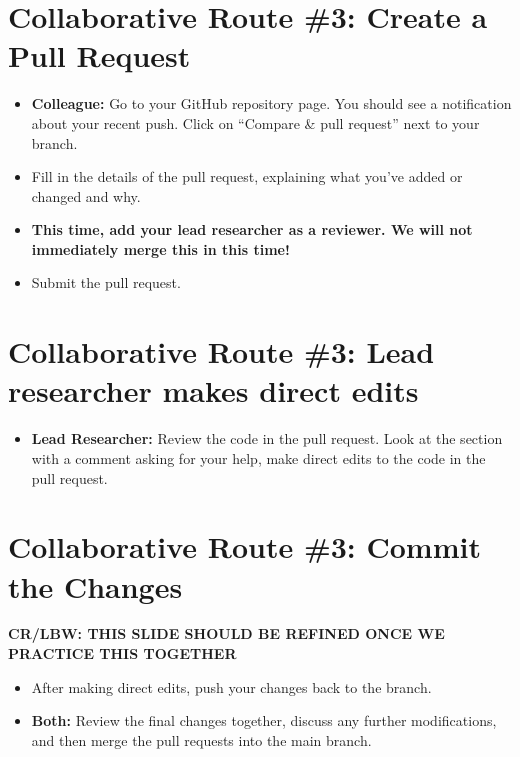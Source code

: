 \documentclass[
]{book}
\providecommand{\tightlist}{%
  \setlength{\itemsep}{0pt}\setlength{\parskip}{0pt}}
\begin{document}
\hypertarget{collaborative-route-3-create-a-pull-request}{%
\section{Collaborative Route \#3: Create a Pull Request}\label{collaborative-route-3-create-a-pull-request}}

\begin{itemize}
\tightlist
\item
  \textbf{Colleague:} Go to your GitHub repository page. You should see a notification about your recent push. Click on ``Compare \& pull request'' next to your branch.\\
\item
  Fill in the details of the pull request, explaining what you've added or changed and why.\\
\item
  \textbf{This time, add your lead researcher as a reviewer. We will not immediately merge this in this time!}\\
\item
  Submit the pull request.
\end{itemize}

\hypertarget{collaborative-route-3-lead-researcher-makes-direct-edits}{%
\section{Collaborative Route \#3: Lead researcher makes direct edits}\label{collaborative-route-3-lead-researcher-makes-direct-edits}}

\begin{itemize}
\tightlist
\item
  \textbf{Lead Researcher:} Review the code in the pull request. Look at the section with a comment asking for your help, make direct edits to the code in the pull request.
\end{itemize}

\hypertarget{collaborative-route-3-commit-the-changes}{%
\section{Collaborative Route \#3: Commit the Changes}\label{collaborative-route-3-commit-the-changes}}

\textbf{CR/LBW: THIS SLIDE SHOULD BE REFINED ONCE WE PRACTICE THIS TOGETHER}

\begin{itemize}
\tightlist
\item
  After making direct edits, push your changes back to the branch.\\
\item
  \textbf{Both:} Review the final changes together, discuss any further modifications, and then merge the pull requests into the main branch.
\end{itemize}
\end{document}
